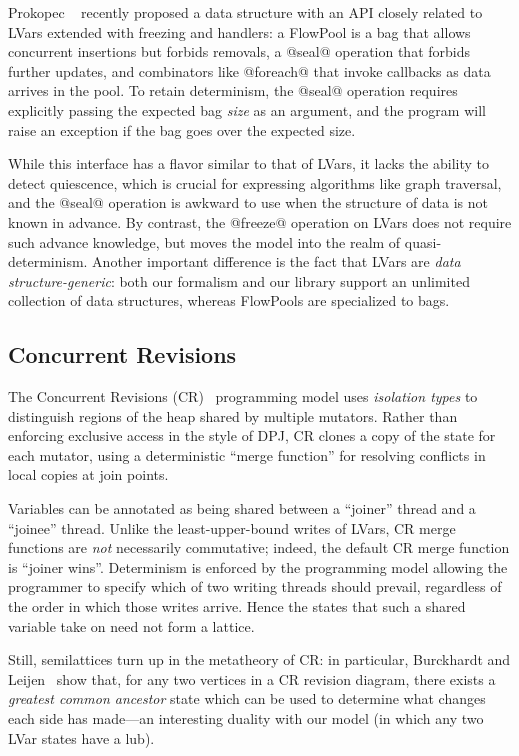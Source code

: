 \documentclass{article}
\begin{document}
Prokopec \etal~\cite{flowpools} recently proposed a data structure
with an API closely related to LVars extended with freezing and
handlers: a FlowPool is a bag that allows concurrent insertions but
forbids removals, a @seal@ operation that forbids further updates,
and combinators like @foreach@ that invoke callbacks as data
arrives in the pool.  To retain determinism, the @seal@ operation
requires explicitly passing the expected bag \emph{size} as an
argument, and the program will raise an exception if the bag goes over
the expected size.

While this interface has a flavor similar to that of LVars, it lacks
the ability to detect quiescence, which is crucial for expressing
algorithms like graph traversal, and the @seal@ operation is awkward
to use when the structure of data is not known in advance.  By
contrast, the @freeze@ operation on LVars does not require such
advance knowledge, but moves the model into the realm of
quasi-determinism.  Another important difference is the fact that
LVars are \emph{data structure-generic}: both our formalism and our
library support an unlimited collection of data structures, whereas
FlowPools are specialized to bags.

\subsection{Concurrent Revisions}

The Concurrent Revisions (CR)~\cite{concurrent-revisions-haskell11}
programming model uses \emph{isolation types} \cite{isolation-types}
to distinguish regions of the heap shared by multiple mutators.
Rather than enforcing exclusive access in the style of DPJ, CR clones
a copy of the state for each mutator, using a deterministic ``merge
function'' for resolving conflicts in local copies at join points.

Variables can be annotated as being shared between a ``joiner'' thread
and a ``joinee'' thread.  Unlike the least-upper-bound writes of
LVars, CR merge functions are \emph{not} necessarily commutative;
indeed, the default CR merge function is ``joiner wins''.  Determinism
is enforced by the programming model allowing the programmer to
specify which of two writing threads should prevail, regardless of the
order in which those writes arrive.  Hence the states that such a
shared variable take on need not form a lattice.

Still, semilattices turn up in the metatheory of CR: in particular,
Burckhardt and Leijen~\cite{semantics-concurrent-revisions} show that,
for any two vertices in a CR revision diagram, there exists a
\emph{greatest common ancestor} state which can be used to determine
what changes each side has made---an interesting duality with our
model (in which any two LVar states have a lub). 
\end{document}
